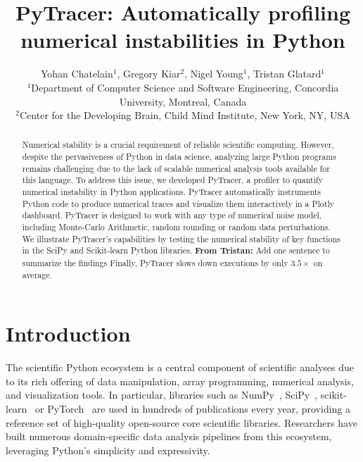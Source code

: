 \documentclass[11pt]{article}
\newcommand{\tristan}[1]{\color{orange}\textbf{From Tristan:} #1\color{black}\xspace}
\newcommand{\pytracer}[0]{PyTracer\xspace}
\begin{document}
\makeatletter
\let\orig@lstnumber=\thelstnumber
\newcommand\lstsetnumber[1]{\gdef\thelstnumber{#1}}
\newcommand\lstresetnumber{\global\let\thelstnumber=\orig@lstnumber}
\makeatother

\title{PyTracer: Automatically profiling numerical instabilities in Python}
\author{Yohan Chatelain$^1$, Gregory Kiar$^2$, Nigel Young$^1$, Tristan Glatard$^1$\\
$^1$Department of Computer Science and Software Engineering, Concordia University, Montreal, Canada\\
$^2$Center for the Developing Brain, Child Mind Institute, New York, NY, USA}
\date{}
\maketitle

\begin{abstract}
Numerical stability is a crucial requirement of reliable scientific computing. However, despite the pervasiveness of Python in data science, analyzing large Python programs remains challenging due to the lack of scalable numerical analysis tools available for this language. To address this issue, we developed \pytracer, a profiler to quantify numerical instability in Python applications. \pytracer automatically instruments Python code to produce numerical traces and visualize them interactively in a Plotly dashboard.
\pytracer is designed to work with any type of numerical noise model, including Monte-Carlo Arithmetic, random rounding or random data perturbations. We illustrate \pytracer's capabilities by testing the numerical stability of key functions in the SciPy and Scikit-learn Python libraries. \tristan{Add one sentence to summarize the findings} Finally, \pytracer slows down executions by only $3.5 \times$ on average.
\end{abstract}

\section{Introduction}

The scientific Python ecosystem is a central component of scientific
analyses due to its rich offering of data manipulation, array programming,
numerical analysis, and visualization tools. In particular, libraries such
as NumPy~\cite{harris2020array}, SciPy~\cite{virtanen2020scipy}, scikit-learn~\cite{pedregosa2011scikit} or PyTorch~\cite{paszke2019pytorch} are used in hundreds of publications every year, providing a reference set of high-quality open-source core scientific libraries. Researchers have built numerous domain-specific data analysis pipelines from this ecosystem, leveraging Python's simplicity and expressivity. 
\end{document}
